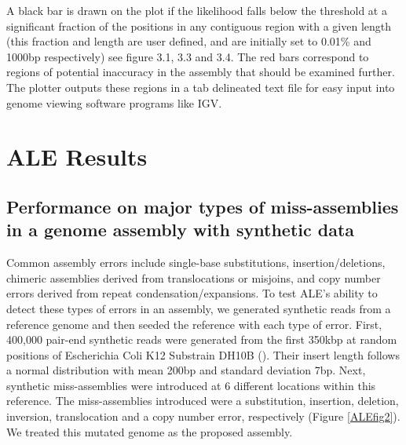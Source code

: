 \documentclass[phd,tocprelim]{cornell}
\begin{document}
A black bar is drawn on the plot if the likelihood falls below the threshold at a significant fraction of the positions in any contiguous region with a given length (this fraction and length are user defined, and are initially set to 0.01\% and 1000bp respectively) see figure 3.1, 3.3 and 3.4. The red bars correspond to regions of potential inaccuracy in the assembly that should be examined further. The plotter outputs these regions in a tab delineated text file for easy input into genome viewing software programs like IGV.



\chapter{ALE Results} %
\label{cha:ALE Results}

\section{Performance on major types of miss-assemblies in a genome assembly with synthetic data}
Common assembly errors include single-base substitutions, insertion/deletions, chimeric assemblies derived from translocations or misjoins, and copy number errors derived from repeat condensation/expansions. To test ALE's ability to detect these types of errors in an assembly, we generated synthetic reads from a reference genome and then seeded the reference with each type of error. First, 400,000 pair-end synthetic reads were generated from the first 350kbp at random positions of Escherichia Coli K12 Substrain DH10B (\cite{Durfee2008}). Their insert length follows a normal distribution with mean 200bp and standard deviation 7bp. Next, synthetic miss-assemblies were introduced at 6 different locations within this reference.  The miss-assemblies introduced were a substitution, insertion, deletion, inversion, translocation and a copy number error, respectively (Figure \ref{ALEfig2}). We treated this mutated genome as the proposed assembly.
\end{document}
